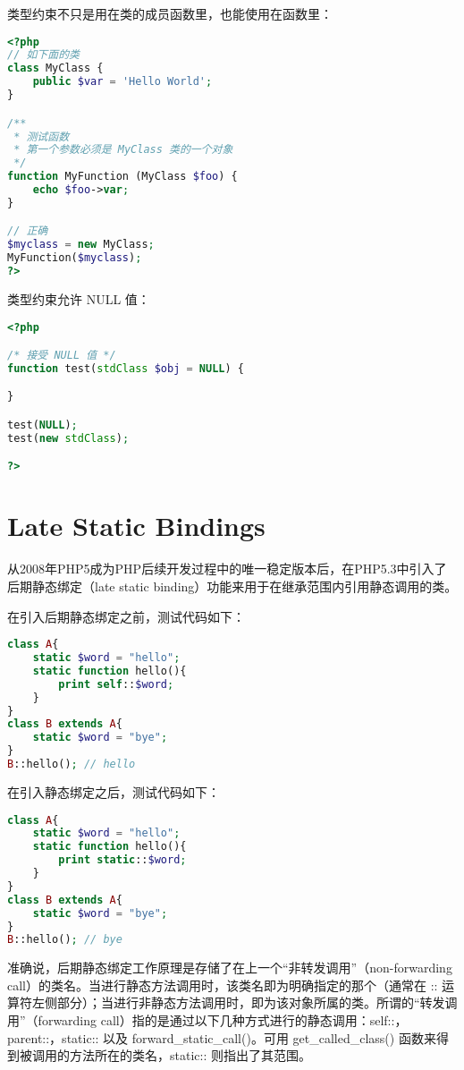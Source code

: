 类型约束不只是用在类的成员函数里，也能使用在函数里：


\begin{lstlisting}[language=PHP]
<?php
// 如下面的类
class MyClass {
    public $var = 'Hello World';
}

/**
 * 测试函数
 * 第一个参数必须是 MyClass 类的一个对象
 */
function MyFunction (MyClass $foo) {
    echo $foo->var;
}

// 正确
$myclass = new MyClass;
MyFunction($myclass);
?>
\end{lstlisting}

类型约束允许 NULL 值：


\begin{lstlisting}[language=PHP]
<?php

/* 接受 NULL 值 */
function test(stdClass $obj = NULL) {

}

test(NULL);
test(new stdClass);

?>
\end{lstlisting}


\chapter{Late Static Bindings}


从2008年PHP5成为PHP后续开发过程中的唯一稳定版本后，在PHP5.3中引入了后期静态绑定（late static binding）功能来用于在继承范围内引用静态调用的类。

在引入后期静态绑定之前，测试代码如下：




\begin{lstlisting}[language=PHP]
class A{
	static $word = "hello";
	static function hello(){
		print self::$word;
	}
}
class B extends A{
	static $word = "bye"; 
}
B::hello(); // hello
\end{lstlisting}

在引入静态绑定之后，测试代码如下：


\begin{lstlisting}[language=PHP]
class A{
	static $word = "hello";
	static function hello(){
		print static::$word;
	}
}
class B extends A{
	static $word = "bye";
}
B::hello(); // bye
\end{lstlisting}


准确说，后期静态绑定工作原理是存储了在上一个“非转发调用”（non-forwarding call）的类名。当进行静态方法调用时，该类名即为明确指定的那个（通常在 :: 运算符左侧部分）；当进行非静态方法调用时，即为该对象所属的类。所谓的“转发调用”（forwarding call）指的是通过以下几种方式进行的静态调用：self::，parent::，static:: 以及 forward\_static\_call()。可用 get\_called\_class() 函数来得到被调用的方法所在的类名，static:: 则指出了其范围。

